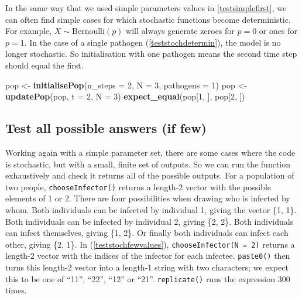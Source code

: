 \documentclass[]{elsarticle} %
\newenvironment{Shaded}{\begin{snugshade}}{\end{snugshade}}
\newcommand{\DataTypeTok}[1]{\textcolor[rgb]{0.13,0.29,0.53}{#1}}
\newcommand{\DecValTok}[1]{\textcolor[rgb]{0.00,0.00,0.81}{#1}}
\newcommand{\KeywordTok}[1]{\textcolor[rgb]{0.13,0.29,0.53}{\textbf{#1}}}
\newcommand{\NormalTok}[1]{#1}
\newcommand{\StringTok}[1]{\textcolor[rgb]{0.31,0.60,0.02}{#1}}
\begin{document}
In the same way that we used simple parameters values in \ref{testsimplefirst}, we can often find simple cases for which stochastic functions become deterministic.
For example, \(X\sim\text{Bernoulli}(p)\) will always generate zeroes for \(p=0\) or ones for \(p=1\).
In the case of a single pathogen (\ref{teststochdetermin}), the model is no longer stochastic.
So initialisation with one pathogen means the second time step should equal the first.
\newline
{}\label{teststochdetermin}

\begin{Shaded}
\begin{Highlighting}[]
\NormalTok{pop <-}\StringTok{ }\KeywordTok{initialisePop}\NormalTok{(}\DataTypeTok{n_steps =} \DecValTok{2}\NormalTok{, }\DataTypeTok{N =} \DecValTok{3}\NormalTok{, }\DataTypeTok{pathogens =} \DecValTok{1}\NormalTok{) }
\NormalTok{pop <-}\StringTok{ }\KeywordTok{updatePop}\NormalTok{(pop, }\DataTypeTok{t =} \DecValTok{2}\NormalTok{, }\DataTypeTok{N =} \DecValTok{3}\NormalTok{)}
\KeywordTok{expect_equal}\NormalTok{(pop[}\DecValTok{1}\NormalTok{, ], pop[}\DecValTok{2}\NormalTok{, ])}
\end{Highlighting}
\end{Shaded}

\hypertarget{allpossible}{%
\subsection*{Test all possible answers (if few)}\label{allpossible}}

Working again with a simple parameter set, there are some cases where the code is stochastic, but with a small, finite set of outputs.
So we can run the function exhaustively and check it returns all of the possible outputs.
For a population of two people, \texttt{chooseInfector()} returns a length-2 vector with the possible elements of 1 or 2.
There are four possibilities when drawing who is infected by whom.
Both individuals can be infected by individual 1, giving the vector \{1, 1\}.
Both individuals can be infected by individual 2, giving \{2, 2\}.
Both individuals can infect themselves, giving \{1, 2\}.
Or finally both individuals can infect each other, giving \{2, 1\}.
In (\ref{teststochfewvalues}), \texttt{chooseInfector(N\ =\ 2)} returns a length-2 vector with the indices of the infector for each infectee.
\texttt{paste0()} then turns this length-2 vector into a length-1 string with two characters; we expect this to be one of ``11'', ``22'', ``12'' or ``21''.
\texttt{replicate()} runs the expression 300 times.
\newline
{}\label{teststochfewvalues}
\end{document}

